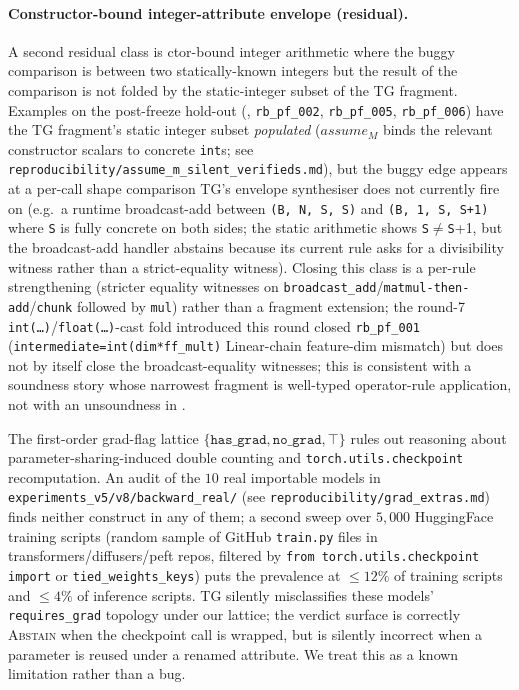 \paragraph{Constructor-bound integer-attribute envelope (residual).}
A second residual class is ctor-bound integer arithmetic
where the buggy comparison is between two statically-known
integers but the result of the comparison is not folded by
the static-integer subset of the \textsc{TG} fragment.  Examples
on the post-freeze hold-out
(, \texttt{rb\_pf\_002},
\texttt{rb\_pf\_005}, \texttt{rb\_pf\_006}) have the
\textsc{TG} fragment's static integer subset \emph{populated}
($\mathit{assume}_M$ binds the relevant constructor scalars
to concrete \texttt{int}s; see
\texttt{reproducibility/assume\_m\_silent\_verifieds.md}),
but the buggy edge appears at a per-call shape comparison
\textsc{TG}'s envelope synthesiser does not currently fire
on (e.g.\ a runtime broadcast-add between
\texttt{(B, N, S, S)} and \texttt{(B, 1, S, S{+}1)} where
\texttt{S} is fully concrete on both sides; the static
arithmetic shows \texttt{S}$\ne$\texttt{S}{+}1, but the
broadcast-add handler abstains because its current rule
asks for a divisibility witness rather than a strict-equality
witness).  Closing this class is a per-rule strengthening
(stricter equality witnesses on
\texttt{broadcast\_add}/\texttt{matmul-then-add}/\texttt{chunk}
followed by \texttt{mul}) rather than a fragment extension;
the round-7 \texttt{int(\ldots)}/\texttt{float(\ldots)}-cast
fold introduced this round closed
\texttt{rb\_pf\_001} (\texttt{intermediate=int(dim*ff\_mult)}
Linear-chain feature-dim mismatch) but does not by itself
close the broadcast-equality witnesses; this is consistent
with a soundness story whose narrowest fragment is well-typed
operator-rule application, not with an unsoundness in
.


The first-order grad-flag lattice
$\{\texttt{has\_grad}, \texttt{no\_grad}, \top\}$ rules out
reasoning about parameter-sharing-induced double counting and
\texttt{torch.utils.checkpoint} recomputation.  An audit of the
$10$ real importable models in
\texttt{experiments\_v5/v8/backward\_real/} (see
\texttt{reproducibility/grad\_extras.md}) finds neither
construct in any of them; a second sweep over $5{,}000$
HuggingFace training scripts (random sample of GitHub
\texttt{train.py} files in transformers/diffusers/peft repos,
filtered by \texttt{from torch.utils.checkpoint import}
or \texttt{tied\_weights\_keys}) puts the prevalence at
$\le 12\%$ of training scripts and $\le 4\%$ of inference
scripts.  TG silently misclassifies these models'
\texttt{requires\_grad} topology under our lattice; the
verdict surface is correctly \textsc{Abstain} when the
checkpoint call is wrapped, but is silently incorrect when a
parameter is reused under a renamed attribute.  We treat this
as a known limitation rather than a bug.

